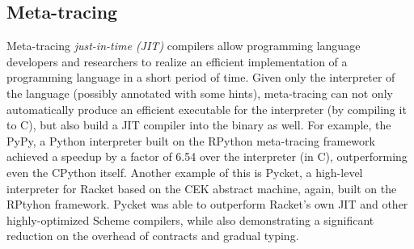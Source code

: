 \subsection{Meta-tracing}

Meta-tracing \textit{just-in-time (JIT)} compilers allow programming
language developers and researchers to realize an efficient
implementation of a programming language in a short period of
time. Given only the interpreter of the language (possibly annotated
with some hints), meta-tracing can not only automatically produce an
efficient executable for the interpreter (by compiling it to C), but
also build a JIT compiler into the binary as well. For example, the
PyPy, a Python interpreter built on the RPython meta-tracing framework
achieved a speedup by a factor of 6.54 over the interpreter (in C),
outperforming even the CPython itself. \cite{bolz09} Another example
of this is Pycket, a high-level interpreter for Racket based on the
CEK abstract machine, again, built on the RPtyhon framework. Pycket
was able to outperform Racket's own JIT and other highly-optimized
Scheme compilers, while also demonstrating a significant reduction on
the overhead of contracts and gradual typing. \cite{pycket15}

